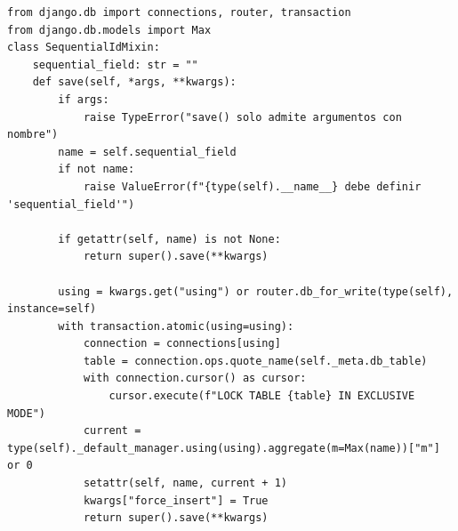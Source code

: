 \begin{lstlisting}[caption={Implementación del SequentialIdMixin para el manejo de bloqueos y secuencias atómicas}, label={anx:code-idiom-sequences}]
from django.db import connections, router, transaction
from django.db.models import Max
class SequentialIdMixin:
    sequential_field: str = ""
    def save(self, *args, **kwargs):
        if args:
            raise TypeError("save() solo admite argumentos con nombre")
        name = self.sequential_field
        if not name:
            raise ValueError(f"{type(self).__name__} debe definir 'sequential_field'")

        if getattr(self, name) is not None:
            return super().save(**kwargs)

        using = kwargs.get("using") or router.db_for_write(type(self), instance=self)
        with transaction.atomic(using=using):
            connection = connections[using]
            table = connection.ops.quote_name(self._meta.db_table)
            with connection.cursor() as cursor:
                cursor.execute(f"LOCK TABLE {table} IN EXCLUSIVE MODE")
            current = type(self)._default_manager.using(using).aggregate(m=Max(name))["m"] or 0
            setattr(self, name, current + 1)
            kwargs["force_insert"] = True
            return super().save(**kwargs)
\end{lstlisting}